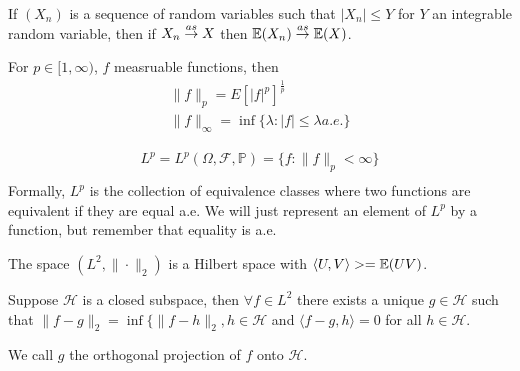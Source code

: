 \begin{thm}
  If $(X_{n})$ is a sequence of random variables such that $|X_{n}|
  \leq Y$ for $Y$ an integrable random variable, then if $X_{n} \overset{as}{\rightarrow}
  X$ then $\E{X_{n}} \cas \E{X}$. 
\end{thm}

\begin{defn}
  \label{defn:9}
  For $p \in [1, \infty)$, $f$ measruable functions, then
  \begin{align}
    \| f \|_{p} = E[|f|^{p}]^{\frac{1}{p}} \\
    \| f \|_{\infty} = \inf \{ \lambda : |f| \leq \lambda a.e. \}
  \end{align}
\end{defn}

\begin{defn}
  \label{defn:10}
  \begin{align*}
    L^{p} = L^{p}(\Omega, \mathcal{F}, \mathbb{P}) = \{ f : \| f
    \|_{p} < \infty \} \\
  \end{align*}
  Formally, $L^{p}$ is the collection of equivalence classes where two
  functions are equivalent if they are equal a.e.  We will just
  represent an element of $L^{p}$ by a function, but remember that
  equality is a.e.
\end{defn}

\begin{thm}
  The space $(L^{2}, \| \cdot \|_{2})$ is a Hilbert space with
  $\langle U, V \rangle> = \E{UV}$.

  Suppose $\mathcal{H}$ is a closed subspace, then $\forall f \in
  L^{2}$ there exists a unique $g \in \mathcal{H}$ such that $\| f - g
  \|_{2} = \inf \{ \| f- h \|_{2}, h \in \mathcal{H}$ and $\langle f
  -g, h \rangle = 0$ for all $h \in \mathcal{H}$.

  We call $g$ the orthogonal projection of $f$ onto $\mathcal{H}$.
\end{thm}

